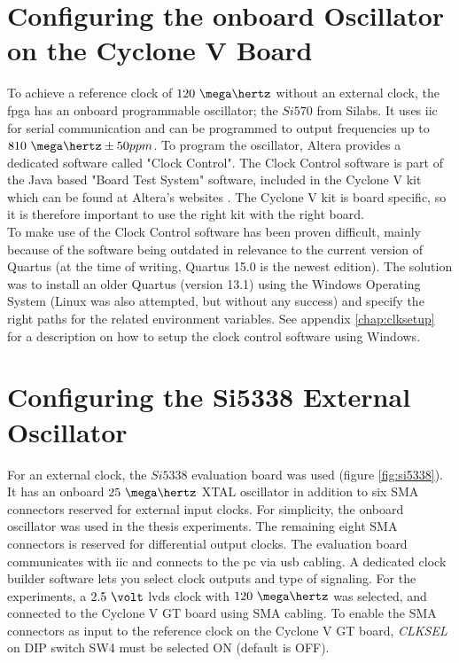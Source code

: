 \documentclass[main.tex]{subfiles}
\begin{document}
\section{Configuring the onboard Oscillator on the Cyclone V Board} \label{sec:inclk}

To achieve a reference clock of $120~\mega\hertz$ without an external clock, the \gls{fpga} has an onboard programmable oscillator; the $Si570$ from Silabs. It uses \gls{iic} for serial communication and can be programmed to output frequencies up to $810~\mega\hertz \pm 50 ppm$. To program the oscillator, Altera provides a dedicated software called "Clock Control". The Clock Control software is part of the Java based "Board Test System" software, included in the Cyclone V kit which can be found at Altera's websites \cite{altera_cyclonekit}. The Cyclone V kit is board specific, so it is therefore important to use the right kit with the right board.\\

To make use of the Clock Control software has been proven difficult, mainly because of the software being outdated in relevance to the current version of Quartus (at the time of writing, Quartus 15.0 is the newest edition). The solution was to install an older Quartus (version 13.1) using the Windows Operating System (Linux was also attempted, but without any success) and specify the right paths for the related environment variables. See appendix \ref{chap:clksetup} for a description on how to setup the clock control software using Windows.

\section{Configuring the Si5338 External Oscillator} \label{sec:exclk}

For an external clock, the $Si5338$ evaluation board was used (figure \ref{fig:si5338}). It has an onboard $25~\mega\hertz$ XTAL oscillator in addition to six SMA connectors reserved for external input clocks. For simplicity, the onboard oscillator was used in the thesis experiments. The remaining eight SMA connectors is reserved for differential output clocks. The evaluation board communicates with \gls{iic} and connects to the \gls{pc} via \gls{usb} cabling. A dedicated clock builder software \cite{siclk} lets you select clock outputs and type of signaling. For the experiments, a $2.5~\volt$ \gls{lvds} clock with $120~\mega\hertz$ was selected, and connected to the Cyclone V GT board using SMA cabling. To enable the SMA connectors as input to the reference clock on the Cyclone V GT board, \textit{CLKSEL} on DIP switch SW4 must be selected ON (default is OFF).
\end{document}
